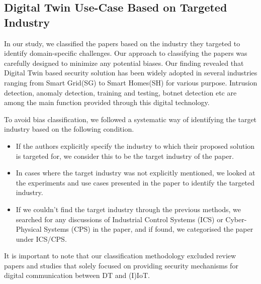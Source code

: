 




\subsection{Digital Twin Use-Case Based on Targeted Industry}
In our study, we classified the papers based on the industry they targeted to identify domain-specific challenges. Our approach to classifying the papers was carefully designed to minimize any potential biases. Our finding revealed that Digital Twin based security solution has been widely adopted in several industries ranging from Smart Grid(SG) to Smart Homes(SH) for various purpose. Intrusion detection, anomaly detection, training and testing, botnet detection etc are among  the main function provided through this digital technology. 


To avoid bias classification, we followed a systematic way of identifying the target industry based on the following condition. 

\begin{itemize}
    \item If the authors explicitly specify the industry to which their proposed solution is targeted for, we consider this to be the target industry of the paper.
    \item In cases where the target industry was not explicitly mentioned, we looked at the experiments and use cases presented in the paper to identify the targeted industry.
    \item If we couldn't find the target industry through the previous methods, we searched for any discussions of Industrial Control Systems (ICS) or Cyber-Physical Systems (CPS) in the paper, and if found, we categorised the paper under ICS/CPS.
\end{itemize}


It is important to note that our classification methodology excluded review papers and studies that solely focused on providing security mechanisms for digital communication between DT and (I)IoT. 



